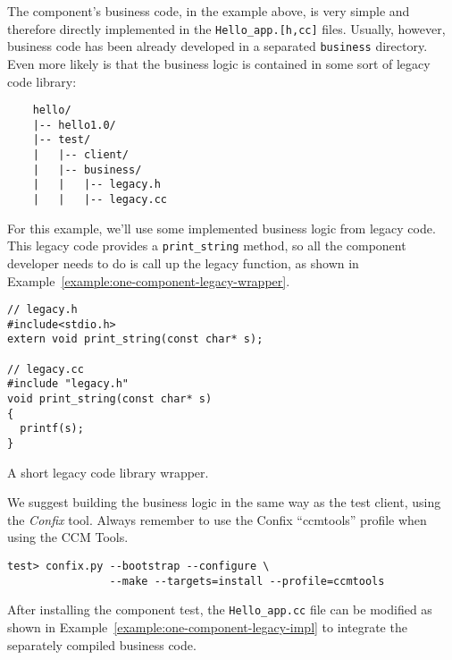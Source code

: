 The component's business code, in the example above, is very simple and
therefore directly implemented in the {\tt Hello\_app.[h,cc]} files. Usually,
however, business code has been already developed in a separated {\tt business}
directory. Even more likely is that the business logic is contained in some sort
of legacy code library:
\begin{small}
\begin{verbatim}
    hello/
    |-- hello1.0/
    |-- test/
    |   |-- client/
    |   |-- business/
    |   |   |-- legacy.h
    |   |   |-- legacy.cc
\end{verbatim}
\end{small}

For this example, we'll use some implemented business logic from legacy code.
This legacy code provides a {\tt print\_string} method, so all the component
developer needs to do is call up the legacy function, as shown in
Example~\ref{example:one-component-legacy-wrapper}.

\begin{Example}
\begin{minifbox}
\begin{small}
\begin{verbatim}
// legacy.h
#include<stdio.h>
extern void print_string(const char* s);

// legacy.cc
#include "legacy.h"
void print_string(const char* s)
{
  printf(s);
}
\end{verbatim}
\end{small}
\end{minifbox}
\caption{A short legacy code library wrapper.}
\label{example:one-component-legacy-wrapper}
\end{Example}

We suggest building the business logic in the same way as the test client, using
the {\it Confix} tool. Always remember to use the Confix ``ccmtools'' profile
when using the CCM Tools.
\begin{small}
\begin{verbatim}
test> confix.py --bootstrap --configure \
                --make --targets=install --profile=ccmtools
\end{verbatim}
\end{small}

After installing the component test, the {\tt Hello\_app.cc} file can be
modified as shown in Example~\ref{example:one-component-legacy-impl} to
integrate the separately compiled business code.

